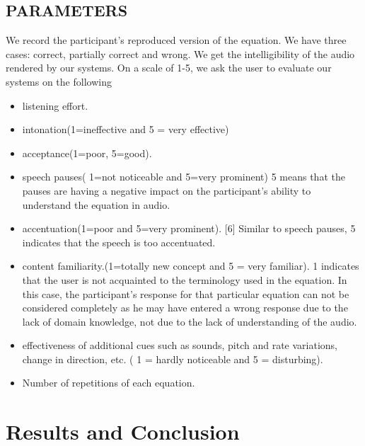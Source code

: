\documentclass{article}
\begin{document}
\subsection{PARAMETERS}
\label{sssec:subsubhead}

We record the participant’s reproduced version of the equation. We have three cases: correct, partially correct and wrong. We get the intelligibility of the audio rendered by our systems.
On a scale of 1-5, we ask the user to evaluate our systems on the following

\begin{itemize} 

 \item listening effort.
 \item   intonation(1=ineffective and 5 = very effective)
 \item   acceptance(1=poor, 5=good).
 \item   speech pauses( 1=not noticeable and 5=very prominent)
5 means that the pauses are having a negative impact on the participant’s ability to understand the equation in audio.
 \item   accentuation(1=poor and 5=very prominent). [6]
Similar to speech pauses, 5 indicates that the speech is too accentuated.
 \item   content familiarity.(1=totally new concept and 5 = very familiar).
1 indicates that the user is not acquainted to the terminology used in the equation. In this case, the participant’s response for that particular equation can not be considered completely as he may have entered a wrong response due to the lack of domain knowledge, not due to the lack of understanding of the audio.
 \item   effectiveness of additional cues such as sounds, pitch and rate variations, change in direction, etc. ( 1 = hardly noticeable and 5 = disturbing).
 \item   Number of repetitions of each equation.

\end{itemize}

\section{Results and Conclusion}
\label{sec:ref}
\end{document}
